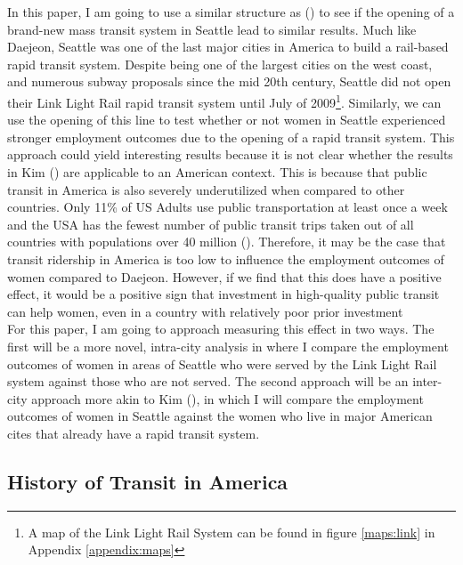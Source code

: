 \documentclass{article}
\begin{document}
In this paper, I am going to use a similar structure as \citeauthor{kim_subways_2019} (\citeyear{kim_subways_2019}) to see if the opening of a brand-new mass transit system in Seattle lead to similar results. Much like Daejeon, Seattle was one of the last major cities in America to build a rail-based rapid transit system. Despite being one of the largest cities on the west coast, and numerous subway proposals since the mid 20th century, Seattle did not open their Link Light Rail rapid transit system until July of 2009\footnote{A map of the Link Light Rail System can be found in figure \ref{maps:link} in Appendix \ref{appendix:maps}}. Similarly, we can use the opening of this line to test whether or not women in Seattle experienced stronger employment outcomes due to the opening of a rapid transit system. This approach could yield interesting results because it is not clear whether the results in Kim (\citeyear{kim_subways_2019}) are applicable to an American context. This is because that public transit in America is also severely underutilized when compared to other countries. Only 11\% of US Adults use public transportation at least once a week and the USA has the fewest number of public transit trips taken out of all countries with populations over 40 million (\cite{pedram_saeidizand_urban_2017}). Therefore, it may be the case that transit ridership in America is too low to influence the employment outcomes of women compared to Daejeon. However, if we find that this does have a positive effect, it would be a positive sign that investment in high-quality public transit can help women, even in a country with relatively poor prior investment \\

For this paper, I am going to approach measuring this effect in two ways. The first will be a more novel, intra-city analysis in where I compare the employment outcomes of women in areas of Seattle who were served by the Link Light Rail system against those who are not served. The second approach will be an inter-city approach more akin to Kim (\citeyear{kim_subways_2019}), in which I will compare the employment outcomes of women in Seattle against the women who live in major American cites that already have a rapid transit system. \\


\subsection{History of Transit in America}
\end{document}
